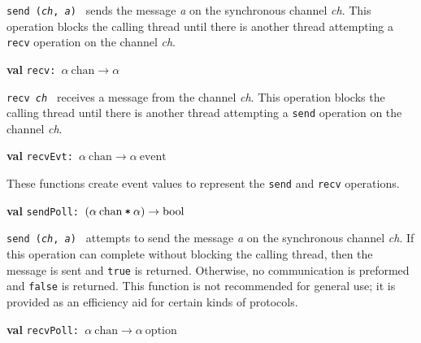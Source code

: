 \begin{descr}
\begin{speccomment}
\item {\tt send (\textit{ch}, \textit{a})           } 
sends the message \textit{a} on the synchronous channel \textit{ch}.\- 	  This operation blocks the calling thread until there is another 	  thread attempting a \texttt{recv} operation on the channel \textit{ch}.\-     \end{speccomment}
\item {}{\textbf{val}} {\tt recv: \(\alpha\:\mathrm{chan}\rightarrow \alpha\)}\label{val-CML.recv}


\begin{speccomment}
\item {\tt recv \textit{ch}           } 
receives a message from the channel \textit{ch}.\- 	  This operation blocks the calling thread until there is another 	  thread attempting a \texttt{send} operation on the channel \textit{ch}.\-     \end{speccomment}
\item {}{\textbf{val}} {\tt recvEvt: \(\alpha\:\mathrm{chan}\rightarrow \alpha\:\mathrm{event}\)}\label{val-CML.recvEvt}


\begin{speccomment}
\item 

	  These functions create event values to represent the \texttt{send} 	  and \texttt{recv} operations.\-     \end{speccomment}
\item {}{\textbf{val}} {\tt sendPoll: \((\alpha\:\mathrm{chan}\:\verb,*,\:\alpha)\rightarrow \mathrm{bool}\)}\label{val-CML.sendPoll}


\begin{speccomment}
\item {\tt send (\textit{ch}, \textit{a})           } 
attempts to send the message \textit{a} on the synchronous channel \textit{ch}.\- 	  If this operation can complete without blocking the calling thread, then 	  the message is sent and {\tt true} is returned.\- 	  Otherwise, no communication is preformed and {\tt false} is returned.\- 	  This function is not recommended for general use; it is provided 	  as an efficiency aid for certain kinds of protocols.\-     \end{speccomment}
\item {}{\textbf{val}} {\tt recvPoll: \(\alpha\:\mathrm{chan}\rightarrow \alpha\:\mathrm{option}\)}\label{val-CML.recvPoll}



\end{descr}
